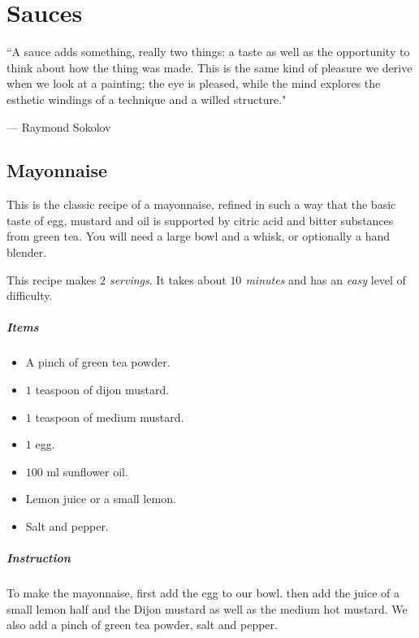 \chapter{Sauces}
\epigraph{``A sauce adds something, really two things: a taste as well as the opportunity to think about how the thing was made. This is the same kind of pleasure we derive when we look at a painting; the eye is pleased, while the mind explores the esthetic windings of a technique and a willed structure."}{--- \textup{Raymond Sokolov}}

\section{Mayonnaise}
\label{mayonnaise}
This is the classic recipe of a mayonnaise, refined in such a way that the basic taste of egg, mustard and oil is supported by citric acid and bitter substances from green tea. You will need a large bowl and a whisk, or optionally a hand blender.

This recipe makes \emph{$2$ servings}. It takes about \emph{$10$ minutes} and has an \emph{easy} level of difficulty.

\paragraph{Items}
\begin{itemize}[noitemsep]
    \item[\ding{182}] A pinch of green tea powder.
    \item[\ding{183}] $1$ teaspoon of dijon mustard.
    \item[\ding{184}] $1$ teaspoon of medium mustard.
    \item[\ding{185}] $1$ egg.
    \item[\ding{186}] $100$ ml sunflower oil.
    \item[\ding{187}] Lemon juice or a small lemon.
    \item[\ding{188}] Salt and pepper.
    
\end{itemize}

\paragraph{Instruction} To make the mayonnaise, first add the egg to our bowl. then add the juice of a small lemon half and the Dijon mustard as well as the medium hot mustard. We also add a pinch of green tea powder, salt and pepper.

